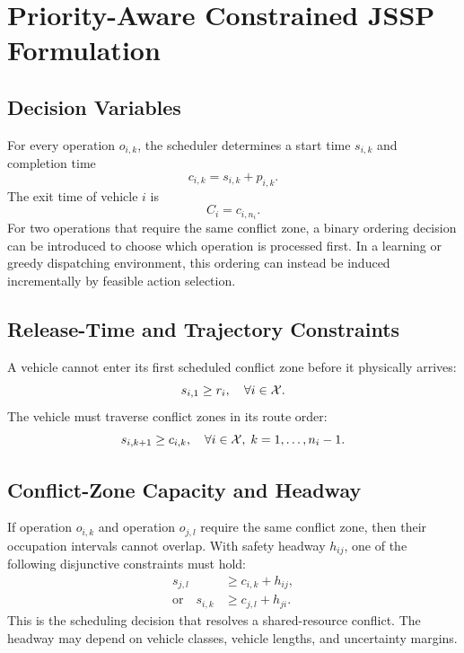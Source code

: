 \section{Priority-Aware Constrained JSSP Formulation}

\subsection{Decision Variables}

For every operation $o_{i,k}$, the scheduler determines a start time $s_{i,k}$ and completion time
\begin{equation}
    c_{i,k} = s_{i,k} + p_{i,k}.
\end{equation}
The exit time of vehicle $i$ is
\begin{equation}
    C_i = c_{i,n_i}.
\end{equation}
For two operations that require the same conflict zone, a binary ordering decision can be introduced to choose which operation is processed first. In a learning or greedy dispatching environment, this ordering can instead be induced incrementally by feasible action selection.

\subsection{Release-Time and Trajectory Constraints}

A vehicle cannot enter its first scheduled conflict zone before it physically arrives:
\begin{equation}
    s_{i,1} \ge r_i, \quad \forall i \in \mathcal{X}.
\end{equation}
The vehicle must traverse conflict zones in its route order:
\begin{equation}
    s_{i,k+1} \ge c_{i,k}, \quad \forall i \in \mathcal{X},\; k=1,\ldots,n_i-1.
\end{equation}

\subsection{Conflict-Zone Capacity and Headway}

If operation $o_{i,k}$ and operation $o_{j,l}$ require the same conflict zone, then their occupation intervals cannot overlap. With safety headway $h_{ij}$, one of the following disjunctive constraints must hold:
\begin{align}
    s_{j,l} &\ge c_{i,k} + h_{ij}, \\
    \text{or}\quad s_{i,k} &\ge c_{j,l} + h_{ji}.
\end{align}
This is the scheduling decision that resolves a shared-resource conflict. The headway may depend on vehicle classes, vehicle lengths, and uncertainty margins.

